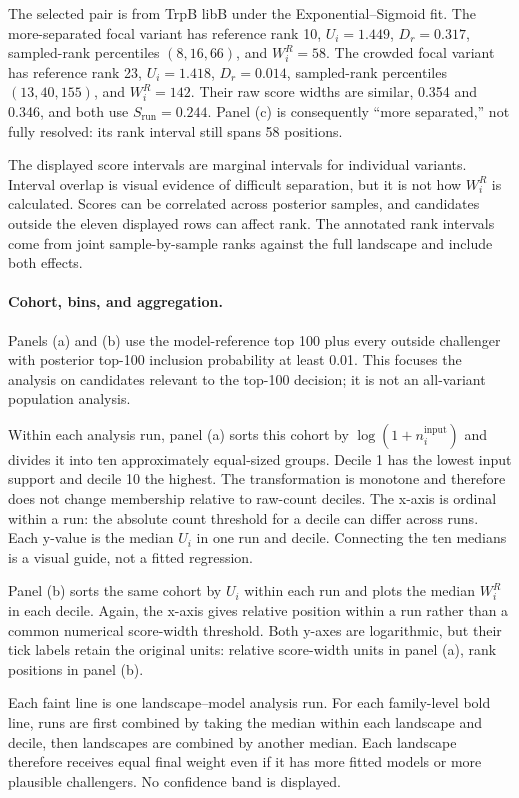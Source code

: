 \documentclass[11pt]{article}
\begin{document}
The selected pair is from TrpB libB under the Exponential--Sigmoid fit. The more-separated focal variant has reference rank 10, $U_i=1.449$, $D_r=0.317$, sampled-rank percentiles $(8,16,66)$, and $W_i^R=58$. The crowded focal variant has reference rank 23, $U_i=1.418$, $D_r=0.014$, sampled-rank percentiles $(13,40,155)$, and $W_i^R=142$. Their raw score widths are similar, 0.354 and 0.346, and both use $S_{\mathrm{run}}=0.244$. Panel (c) is consequently ``more separated,'' not fully resolved: its rank interval still spans 58 positions.

The displayed score intervals are marginal intervals for individual variants. Interval overlap is visual evidence of difficult separation, but it is not how $W_i^R$ is calculated. Scores can be correlated across posterior samples, and candidates outside the eleven displayed rows can affect rank. The annotated rank intervals come from joint sample-by-sample ranks against the full landscape and include both effects.

\paragraph{Cohort, bins, and aggregation.}
Panels (a) and (b) use the model-reference top 100 plus every outside challenger with posterior top-100 inclusion probability at least 0.01. This focuses the analysis on candidates relevant to the top-100 decision; it is not an all-variant population analysis.

Within each analysis run, panel (a) sorts this cohort by $\log(1+n_i^{\mathrm{input}})$ and divides it into ten approximately equal-sized groups. Decile 1 has the lowest input support and decile 10 the highest. The transformation is monotone and therefore does not change membership relative to raw-count deciles. The x-axis is ordinal within a run: the absolute count threshold for a decile can differ across runs. Each y-value is the median $U_i$ in one run and decile. Connecting the ten medians is a visual guide, not a fitted regression.

Panel (b) sorts the same cohort by $U_i$ within each run and plots the median $W_i^R$ in each decile. Again, the x-axis gives relative position within a run rather than a common numerical score-width threshold. Both y-axes are logarithmic, but their tick labels retain the original units: relative score-width units in panel (a), rank positions in panel (b).

Each faint line is one landscape--model analysis run. For each family-level bold line, runs are first combined by taking the median within each landscape and decile, then landscapes are combined by another median. Each landscape therefore receives equal final weight even if it has more fitted models or more plausible challengers. No confidence band is displayed.
\end{document}
